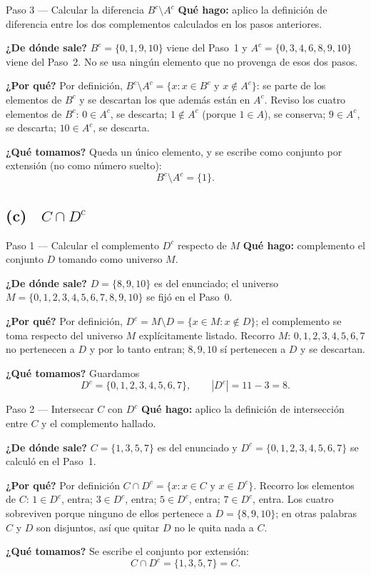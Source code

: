 \documentclass[11pt]{article}
\begin{document}
\begin{paso}{Paso 3 --- Calcular la diferencia $B^{c}\setminus A^{c}$}
\textbf{Qué hago:} aplico la definición de diferencia entre los dos complementos calculados
en los pasos anteriores.

\textbf{¿De dónde sale?} $B^{c}=\{0,1,9,10\}$ viene del Paso~1 y $A^{c}=\{0,3,4,6,8,9,10\}$
viene del Paso~2. No se usa ningún elemento que no provenga de esos dos pasos.

\textbf{¿Por qué?} Por definición, $B^{c}\setminus A^{c}=\{x: x\in B^{c} \text{ y }
x\notin A^{c}\}$: se parte de los elementos de $B^{c}$ y se descartan los que además están en
$A^{c}$. Reviso los cuatro elementos de $B^{c}$: $0\in A^{c}$, se descarta; $1\notin A^{c}$
(porque $1\in A$), se conserva; $9\in A^{c}$, se descarta; $10\in A^{c}$, se descarta.

\textbf{¿Qué tomamos?} Queda un único elemento, y se escribe como conjunto por extensión (no
como número suelto):
\[
B^{c}\setminus A^{c}=\{1\}.
\]
\end{paso}

\subsection*{(c) \ $C\cap D^{c}$}

\begin{paso}{Paso 1 --- Calcular el complemento $D^{c}$ respecto de $M$}
\textbf{Qué hago:} complemento el conjunto $D$ tomando como universo $M$.

\textbf{¿De dónde sale?} $D=\{8,9,10\}$ es del enunciado; el universo
$M=\{0,1,2,3,4,5,6,7,8,9,10\}$ se fijó en el Paso~0.

\textbf{¿Por qué?} Por definición, $D^{c}=M\setminus D=\{x\in M: x\notin D\}$; el complemento
se toma respecto del universo $M$ explícitamente listado. Recorro $M$: $0,1,2,3,4,5,6,7$ no
pertenecen a $D$ y por lo tanto entran; $8,9,10$ sí pertenecen a $D$ y se descartan.

\textbf{¿Qué tomamos?} Guardamos
\[
D^{c}=\{0,1,2,3,4,5,6,7\},\qquad |D^{c}|=11-3=8 .
\]
\end{paso}

\begin{paso}{Paso 2 --- Intersecar $C$ con $D^{c}$}
\textbf{Qué hago:} aplico la definición de intersección entre $C$ y el complemento hallado.

\textbf{¿De dónde sale?} $C=\{1,3,5,7\}$ es del enunciado y $D^{c}=\{0,1,2,3,4,5,6,7\}$ se
calculó en el Paso~1.

\textbf{¿Por qué?} Por definición $C\cap D^{c}=\{x: x\in C \text{ y } x\in D^{c}\}$. Recorro
los elementos de $C$: $1\in D^{c}$, entra; $3\in D^{c}$, entra; $5\in D^{c}$, entra;
$7\in D^{c}$, entra. Los cuatro sobreviven porque ninguno de ellos pertenece a
$D=\{8,9,10\}$; en otras palabras $C$ y $D$ son disjuntos, así que quitar $D$ no le quita nada
a $C$.

\textbf{¿Qué tomamos?} Se escribe el conjunto por extensión:
\[
C\cap D^{c}=\{1,3,5,7\}=C.
\]
\end{paso}
\end{document}
